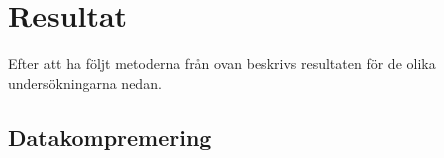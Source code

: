 \section{Resultat}
\label{sec:tim-results}
Efter att ha följt metoderna från ovan beskrivs resultaten för de olika undersökningarna nedan. 

\subsection{Datakompremering}

